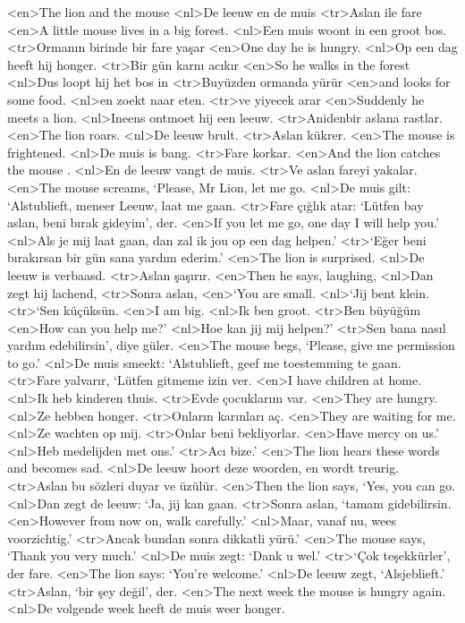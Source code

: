 <en>The lion and the mouse  
<nl>De leeuw en de muis  
<tr>Aslan ile fare 
<en>A little mouse lives in a big forest.
<nl>Een muis woont in een groot bos.
<tr>Ormanın birinde bir fare yaşar
<en>One day he is hungry.
<nl>Op een dag heeft hij honger. 
<tr>Bir gün karnı acıkır 
<en>So he walks in the forest
<nl>Dus loopt hij het bos in
<tr>Buyüzden ormanda yürür
<en>and looks for some food.
<nl>en zoekt naar eten.
<tr>ve yiyecek arar
<en>Suddenly he meets a lion.
<nl>Ineens ontmoet hij een leeuw.
<tr>Anidenbir aslana rastlar.
<en>The lion roars.
<nl>De leeuw brult.
<tr>Aslan  kükrer.
<en>The mouse is frightened.
<nl>De muis is bang.
<tr>Fare korkar.
<en>And the lion catches the mouse .
<nl>En de leeuw vangt de muis. 
<tr>Ve aslan fareyi yakalar.
<en>The mouse screams, `Please, Mr Lion, let me go.
<nl>De muis gilt: `Alstublieft, meneer Leeuw, laat me gaan.
<tr>Fare çığlık atar: `Lütfen bay aslan, beni bırak gideyim', der. 
<en>If you let me go, one day I will help you.'
<nl>Als je mij laat gaan, dan zal ik jou op een dag helpen.'
<tr>`Eğer beni bırakırsan bir gün sana yardım ederim.'
<en>The lion is surprised.
<nl>De leeuw is verbaasd.
<tr>Aslan şaşırır.
<en>Then he says, laughing, 
<nl>Dan zegt hij lachend,
<tr>Sonra aslan,
<en>`You are small.
<nl>`Jij bent klein.
<tr>`Sen küçüksün.
<en>I am big.
<nl>Ik ben groot.
<tr>Ben büyüğüm
<en>How can you help me?'
<nl>Hoe kan jij mij helpen?'
<tr>Sen bana nasıl yardım edebilirsin', diye güler.
<en>The mouse begs, `Please, give me permission to go.'
<nl>De muis smeekt: `Alstublieft, geef me toestemming te gaan.
<tr>Fare yalvarır, `Lütfen gitmeme izin ver.  
<en>I have children at home.
<nl>Ik heb kinderen thuis.
<tr>Evde çocuklarım var.
<en>They are hungry. 
<nl>Ze hebben honger.
<tr>Onların karınları aç. 
<en>They are waiting for me.
<nl>Ze wachten op mij. 
<tr>Onlar beni bekliyorlar. 
<en>Have mercy on us.'
<nl>Heb medelijden met ons.'
<tr>Acı bize.'
<en>The lion hears these words and becomes sad.
<nl>De leeuw hoort deze woorden, en wordt treurig.
<tr>Aslan bu sözleri duyar ve üzülür.
<en>Then the lion says, `Yes, you can go.
<nl>Dan zegt de leeuw: `Ja, jij kan gaan.
<tr>Sonra aslan, `tamam gidebilirsin.
<en>However from now on, walk carefully.'
<nl>Maar, vanaf nu, wees voorzichtig.'
<tr>Ancak  bundan sonra dikkatli yürü.'
<en>The mouse says, `Thank you very much.'
<nl>De muis zegt: `Dank u wel.'
<tr>`Çok teşekkürler', der fare.
<en>The lion says: `You’re welcome.'
<nl>De leeuw zegt, `Alsjeblieft.'
<tr>Aslan,  `bir şey değil', der.
<en>The next week the mouse is hungry again.
<nl>De volgende week heeft de muis weer honger.
